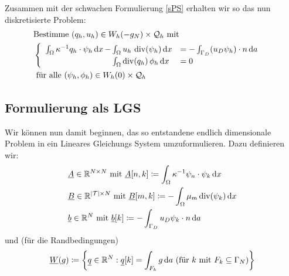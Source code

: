 Zusammen mit der schwachen Formulierung \eqref{sPS} erhalten wir so das nun diskretisierte Problem:
\begin{align*}
&\text{Bestimme } (q_h,u_h) \in W_h(-g_N) \times \mathcal{Q}_h \text{ mit}\\
&\begin{cases}
\begin{array}{llll}
\int_{\Omega} \kappa^{-1} q_h \cdot \psi_h \, \mathrm{d} x \, - \mkern-15mu &\int_{\Omega} u_h \, \operatorname{div}(\psi_h) \, \mathrm{d} x &= - \int_{\Gamma_D} (u_D \psi_h) \cdot n \, \mathrm{d} a\\
&\int_{\Omega} \operatorname{div}(q_h) \, \phi_h \, \mathrm{d} x &= 0
\end{array}
\end{cases}	\\
&\text{ für alle } (\psi_h, \phi_h) \in W_h(0) \times \mathcal{Q}_h
\end{align*} 




\subsection{Formulierung als LGS}

Wir können nun damit beginnen, das so entstandene endlich dimensionale Problem in ein Lineares Gleichungs System umzuformulieren. Dazu definieren wir:
	\begin{align*}
	&\underline{A} \in \mathbb{R}^{N \times N} \text{ mit } \underline{A}[n,k] \coloneqq \int_{\Omega} \kappa^{-1} \psi_n \cdot \psi_k \, \mathrm{d} x \\
	&\underline{B} \in \mathbb{R}^{|\mathcal{T}| \times N} \text{ mit } \underline{B}[m,k] \coloneqq - \int_{\Omega} \mu_m \operatorname{div}(\psi_k) \, \mathrm{d} x \\
	&\underline{b} \in \mathbb{R}^N \text{ mit } \underline{b}[k] \coloneqq - \int_{\Gamma_D} u_D \psi_k \cdot n \, \mathrm{d} a
	\end{align*}
	und (für die Randbedingungen)
	\begin{align*}
	\underline{W}(g) \coloneqq \left\{ \underline{q} \in \mathbb{R}^N : \underline{q}[k] = \int_{F_k} g  \, \mathrm{d} a \ (\text{für } k \text{ mit } F_k \subseteq \Gamma_N) \right\} 
	\end{align*}


